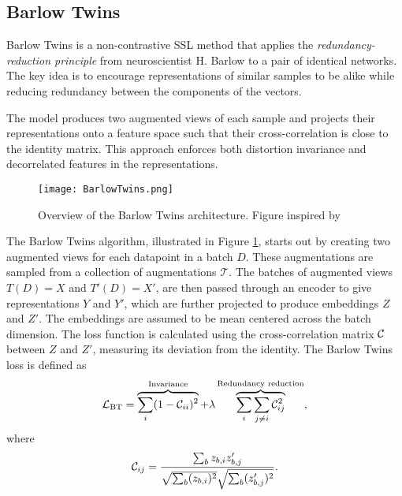\documentclass[../../thesis.tex]{subfiles}
\begin{document}

\subsection{Barlow Twins}

Barlow Twins is a non-contrastive SSL method that applies the \textit{redundancy-reduction principle}\cite{Barlow_origin} from neuroscientist H. Barlow to a pair of identical networks. The key idea is to encourage representations of similar samples to be alike while reducing redundancy between the components of the vectors.\newline

The model produces two augmented views of each sample and projects their representations onto a feature space such that their cross-correlation is close to the identity matrix. This approach enforces both distortion invariance and decorrelated features in the representations.\newline

\begin{figure}[h]
    \texttt{[image: BarlowTwins.png]}
    \centering    
    \caption{Overview of the Barlow Twins architecture. Figure inspired by \cite{zbontar2021barlow}}
    \label{fig:BarlowTwins}
\end{figure}

The Barlow Twins algorithm, illustrated in Figure \ref{fig:BarlowTwins}, starts out by creating two augmented views for each datapoint in a batch $D$. These augmentations are sampled from a collection of augmentations $\mathcal{T}$. The batches of augmented views $T(D) = X$ and $T'(D) =X'$, are then passed through an encoder to give representations $Y$ and $Y'$, which are further projected to produce embeddings $Z$ and $Z'$. The embeddings are assumed to be mean centered across the batch dimension. The loss function is calculated using the cross-correlation matrix $\mathcal{C}$ between $Z$ and $Z'$, measuring its deviation from the identity. The Barlow Twins loss is defined as
\begin{equation}
    \label{eq:BTLoss}
    \mathcal{L}_{\text{BT}} = 
    \overbrace{\sum_i (1 - \mathcal{C}_{ii})^2}^{\text{Invariance}}
    +\lambda  \overbrace{\sum_i\sum_{j\neq i} \mathcal{C}_{ij}^2}^{\text{Redundancy reduction}},
\end{equation}
where
\begin{equation}
    \mathcal{C}_{ij} = \frac{\sum_b z_{b,i}z_{b,j}'}{\sqrt{\sum_b (z_{b,i})^2}\sqrt{\sum_b (z_{b,j}')^2}}.
\end{equation}
\end{document}
